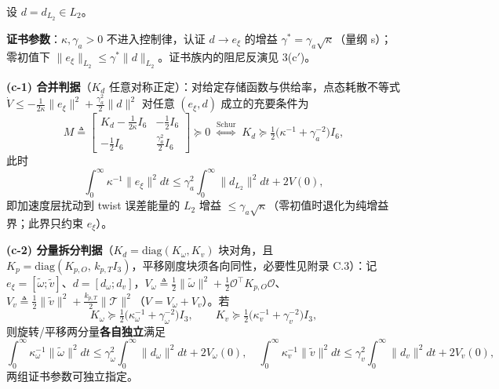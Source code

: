 \renewcommand{\thetheorem}{3(c)}%
\begin{theorem}\label{thm:3c}
设 $d=d_{L_2}\in L_2$。

\textbf{证书参数}：$\kappa,\gamma_a>0$ 不进入控制律，认证 $d\to e_\xi$ 的增益 $\gamma^{*}=\gamma_a\sqrt\kappa$（量纲 s）；零初值下 $\|e_\xi\|_{L_2}\le\gamma^{*}\|d\|_{L_2}$。证书族内的阻尼反演见 3(c$'$)。

\textbf{(c-1) 合并判据}（$K_d$ 任意对称正定）：对给定存储函数与供给率，点态耗散不等式 $\dot V\le-\tfrac1{2\kappa}\|e_\xi\|^2+\tfrac{\gamma_a^2}2\|d\|^2$ 对任意 $(e_\xi,d)$ 成立的充要条件为
\begin{equation}
M\triangleq\begin{bmatrix}K_d-\tfrac1{2\kappa}I_6 & -\tfrac12 I_6\\[2pt] -\tfrac12 I_6 & \tfrac{\gamma_a^2}2 I_6\end{bmatrix}\succeq0
\;\overset{\text{Schur}}{\Longleftrightarrow}\;
K_d\succeq\tfrac12\bigl(\kappa^{-1}+\gamma_a^{-2}\bigr)I_6 ,
\tag{5.6a}\label{eq:5.6a}
\end{equation}
此时
\begin{equation}
\int_0^\infty\kappa^{-1}\|e_\xi\|^2dt\le\gamma_a^2\int_0^\infty\|d_{L_2}\|^2dt+2V(0),
\tag{5.6}\label{eq:5.6}
\end{equation}
即加速度层扰动到 twist 误差能量的 $L_2$ 增益 $\le\gamma_a\sqrt\kappa$（零初值时退化为纯增益界；此界只约束 $e_\xi$）。

\textbf{(c-2) 分量拆分判据}（$K_d=\mathrm{diag}(K_\omega,K_v)$ 块对角，且 $K_p=\mathrm{diag}(K_{p,O},\,k_{p,T}I_3)$，平移刚度块须各向同性，必要性见附录 C.3）：记 $e_\xi=[\tilde\omega;\tilde v]$、$d=[d_\omega;d_v]$，$V_\omega\triangleq\tfrac12\|\tilde\omega\|^2+\tfrac12\mathcal O^\top K_{p,O}\mathcal O$、$V_v\triangleq\tfrac12\|\tilde v\|^2+\tfrac{k_{p,T}}2\|\mathcal T\|^2$（$V=V_\omega+V_v$）。若
\begin{equation}
K_\omega\succeq\tfrac12\bigl(\kappa_\omega^{-1}+\gamma_\omega^{-2}\bigr)I_3,
\qquad
K_v\succeq\tfrac12\bigl(\kappa_v^{-1}+\gamma_v^{-2}\bigr)I_3,
\tag{5.6b}\label{eq:5.6b}
\end{equation}
则旋转/平移两分量\textbf{各自独立}满足
\begin{equation}
\int_0^\infty\kappa_\omega^{-1}\|\tilde\omega\|^2dt\le\gamma_\omega^2\int_0^\infty\|d_\omega\|^2dt+2V_\omega(0),
\quad
\int_0^\infty\kappa_v^{-1}\|\tilde v\|^2dt\le\gamma_v^2\int_0^\infty\|d_v\|^2dt+2V_v(0),
\tag{5.6$'$}\label{eq:5.6p}
\end{equation}
两组证书参数可独立指定。
\end{theorem}

